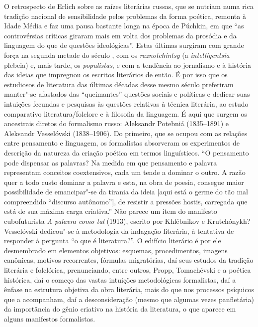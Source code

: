 O retrospecto de Erlich sobre as raízes literárias russas, que se nutriam
numa rica tradição nacional de sensibilidade pelos problemas da forma
poética, remonta à Idade Média e faz uma pausa bastante longa na época de
Púchkin, em que ``as controvérsias críticas giraram mais em volta dos
problemas da prosódia e da linguagem do que de questões ideológicas''.
Estas últimas surgiram com grande força na segunda metade do século ,
com os \emph{raznotchíntsy} (a \emph{intelligentsia} plebeia)
e, mais tarde, os \emph{populistas}, e com a tendência ao jornalismo e à
história das ideias que impregnou os escritos literários de então. É por
isso que os estudiosos de literatura das últimas décadas desse mesmo século
preferiram manter"-se afastados das ``queimantes'' questões sociais e políticas e
dedicar suas intuições fecundas e pesquisas às questões relativas
 à técnica literária, ao estudo comparativo literatura/folclore
e à filosofia da linguagem. É aqui que surgem os ancestrais diretos do
formalismo russo: Aleksandr Potebniá (1835--1891) e Aleksandr Vesselóvski (1838--1906).
Do primeiro, que se ocupou com as relações entre pensamento e linguagem,
os formalistas absorveram os experimentos de descrição da natureza da
criação poética em termos linguísticos. ``O pensamento pode dispensar as
palavras? Na medida em que pensamento e palavra
representam conceitos coextensivos, cada um tende a dominar o outro. A
razão quer a todo custo dominar a palavra e esta, na obra de poesia,
consegue maior possibilidade de emancipar"-se da tirania da ideia [aqui
está o germe do tão mal compreendido ``discurso autônomo''], de
resistir a pressões hostis, carregada que está de sua máxima carga
criativa.'' Não parece um item do manifesto cubofuturista \emph{A palavra como
tal} (1913), escrito por Khlébnikov e Krutchónykh? Vesselóvski dedicou"-se à metodologia da indagação literária, à tentativa de responder à pergunta ``o que é literatura?''. O edifício
literário é por ele desmembrado em elementos objetivos: esquemas,
procedimentos, imagens canônicas, motivos recorrentes, fórmulas
migratórias, daí seus estudos da tradição literária e folclórica,
prenunciando, entre outros, Propp, Tomachévski e a poética histórica,
daí o começo das vastas intuições metodológicas formalistas, daí a
ênfase na estrutura objetiva da obra literária, mais do que nos
processos psíquicos que a acompanham, daí a desconsideração (mesmo que
algumas vezes panfletária) da importância do gênio criativo na
história da literatura, o que aparece em alguns manifestos formalistas.

